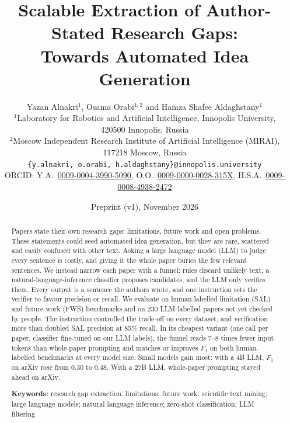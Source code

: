 \documentclass[11pt,a4paper]{article}
\title{\textbf{Scalable Extraction of Author-Stated Research Gaps:\\Towards Automated Idea Generation}}
\author{Yazan Alnakri$^{1}$, Osama Orabi$^{1,2}$ and Hamza Shafee Aldaghstany$^{1}$\\[4pt]
\normalsize $^{1}$Laboratory for Robotics and Artificial Intelligence, Innopolis University,\\\normalsize 420500 Innopolis, Russia\\
\normalsize $^{2}$Moscow Independent Research Institute of Artificial Intelligence (MIRAI),\\\normalsize 117218 Moscow, Russia\\[2pt]
\normalsize \texttt{\{y.alnakri, o.orabi, h.aldaghstany\}@innopolis.university}\\[2pt]
\small ORCID: Y.A.~\href{https://orcid.org/0009-0004-3990-5090}{0009-0004-3990-5090}, O.O.~\href{https://orcid.org/0009-0000-0028-315X}{0009-0000-0028-315X}, H.S.A.~\href{https://orcid.org/0009-0008-4938-2472}{0009-0008-4938-2472}}
\date{Preprint (v1), November 2026}
\begin{document}
\maketitle

\begin{abstract}
\noindent Papers state their own research gaps: limitations, future work and open problems. These statements could seed automated idea generation, but they are rare, scattered and easily confused with other text. Asking a large language model (LLM) to judge every sentence is costly, and giving it the whole paper buries the few relevant sentences. We instead narrow each paper with a funnel: rules discard unlikely text, a natural-language-inference classifier proposes candidates, and the LLM only verifies them. Every output is a sentence the authors wrote, and one instruction sets the verifier to favour precision or recall. We evaluate on human-labelled limitation (SAL) and future-work (FWS) benchmarks and on 230 LLM-labelled papers not yet checked by people. The instruction controlled the trade-off on every dataset, and verification more than doubled SAL precision at 85\% recall. In its cheapest variant (one call per paper, classifier fine-tuned on our LLM labels), the funnel reads 7--8 times fewer input tokens than whole-paper prompting and matches or improves \texorpdfstring{$F_1$}{F1} on both human-labelled benchmarks at every model size. Small models gain most: with a 4B LLM, \texorpdfstring{$F_1$}{F1} on arXiv rose from 0.30 to 0.48. With a 27B LLM, whole-paper prompting stayed ahead on arXiv.

\medskip\noindent\textbf{Keywords:} research gap extraction; limitations; future work; scientific text mining; large language models; natural language inference; zero-shot classification; LLM filtering
\end{abstract}







\end{document}
